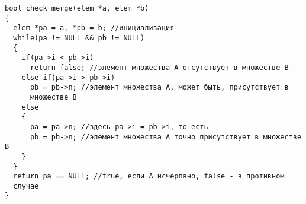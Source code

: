\documentclass[a5paper]{article}
\begin{document}

\begin{lstlisting}
bool check_merge(elem *a, elem *b)
{
  elem *pa = a, *pb = b; //инициализация
  while(pa != NULL && pb != NULL)
  {
    if(pa->i < pb->i)
      return false; //элемент множества A отсутствует в множестве B
    else if(pa->i > pb->i)
      pb = pb->n; //элемент множества A, может быть, присутствует в
      множестве B
    else
    {
      pa = pa->n; //здесь pa->i = pb->i, то есть
      pb = pb->n; //элемент множества A точно присутствует в множестве B
    }
  }
  return pa == NULL; //true, если A исчерпано, false - в противном
  случае
}
\end{lstlisting}
\end{document}
